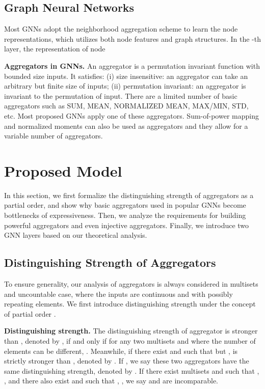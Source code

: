 \documentclass{article} \usepackage{iclr2021_conference,times}
\begin{document}
\subsection{Graph Neural Networks}

Most GNNs adopt the neighborhood aggregation scheme \citep{gilmer2017neural} to learn the node representations,
which utilizes both node features and graph structures.
In the -th layer,
the representation of node 


\textbf{Aggregators in GNNs.}
An aggregator is a permutation invariant function \citep{zaheer2017deep} with bounded size inputs.
It satisfies:
(i) size insensitive: an aggregator can take an arbitrary but finite size of inputs;
(ii) permutation invariant: an aggregator is invariant to the permutation of input.
There are a limited number of basic aggregators such as SUM, MEAN, NORMALIZED MEAN, MAX/MIN, STD, etc.
Most proposed GNNs apply one of these aggregators.
Sum-of-power mapping \citep{zaheer2017deep} and normalized moments \citep{corso2020principal} can also be used as aggregators and they allow for a variable number of aggregators.

\section{Proposed Model}
In this section, we first formalize the distinguishing strength of aggregators as a partial order,
and show why basic aggregators used in popular GNNs become bottlenecks of expressiveness.
Then, we analyze the requirements for building powerful aggregators and even injective aggregators.
Finally, we introduce two GNN layers based on our theoretical analysis.

\subsection{Distinguishing Strength of Aggregators}
\label{formal-aggregator}
To ensure generality, 
our analysis of aggregators is always considered in multisets and uncountable case,
where the inputs are continuous and with possibly repeating elements.
We first introduce distinguishing strength under the concept of partial order \citep{schmidt2011relational}.

\textbf{Distinguishing strength.}
The distinguishing strength of aggregator  is stronger than ,
denoted by ,
if and only if for any two multisets  and 
where the number of elements can be different,
.
Meanwhile, if there exist  and  such that  but ,
 is strictly stronger than , denoted by .
If ,
we say these two aggregators have the same distinguishing strength, denoted by .
If there exist multisets  and  such that , , and there also exist  and  such that , , we say  and  are incomparable.
\end{document}
